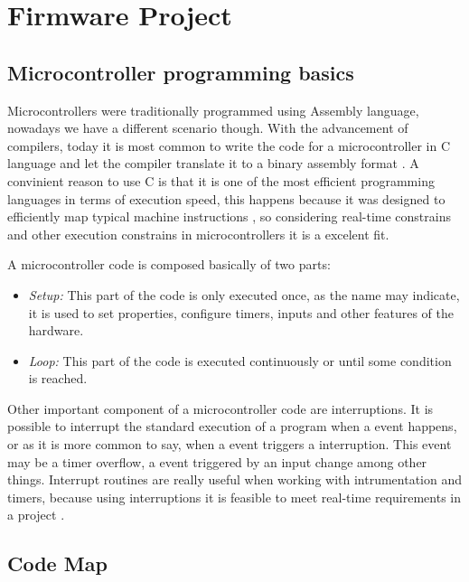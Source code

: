 \chapter{Firmware Project}\label{ch:software-project}

	\section{Microcontroller programming basics}\label{ssec:microcontroller-programming-basics}
		Microcontrollers were traditionally programmed using Assembly language, nowadays we have a different scenario though. With the advancement of compilers, today it is most common to write the code for a microcontroller in C language and let the compiler translate it to a binary assembly format \cite{Mazidi:2010:AME:1824214}. A convinient reason to use C is that it is one of the most efficient programming languages in terms of execution speed, this happens because it was designed to efficiently map typical machine instructions \cite{kernighan2006c}, so considering real-time constrains and other execution constrains in microcontrollers it is a excelent fit.
		
		\par
		A microcontroller code is composed basically of two parts:
		
		\begin{itemize}
			\item \textit{Setup: } This part of the code is only executed once, as the name may indicate, it is used to set properties, configure timers, inputs and other features of the hardware.
			\item \textit{Loop: } This part of the code is executed continuously or until some condition is reached. 
		\end{itemize}
		
		\par
		
		Other important component of a microcontroller code are interruptions. It is possible to interrupt the standard execution of a program when a event happens, or as it is more common to say, when a event triggers a interruption. This event may be a timer overflow, a event triggered by an input change among other things. Interrupt routines are really useful when working with intrumentation and timers, because using interruptions it is feasible to meet real-time requirements in a project \cite{mukaro1999microcontroller}.
		
	\section{Code Map}\label{sec:microcontroller-code-map}
	
